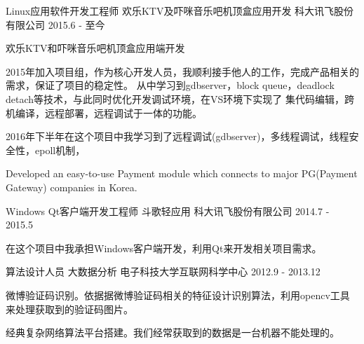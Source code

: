 

\begin{cventries}

  \cventry
    {Linux应用软件开发工程师} %
    {欢乐KTV及吓咪音乐吧机顶盒应用开发} %
    {科大讯飞股份有限公司} %
    {2015.6 - 至今} %
    {
      \begin{cvitems} %
        \item {欢乐KTV和吓咪音乐吧机顶盒应用端开发}
        \item {2015年加入项目组，作为核心开发人员，我顺利接手他人的工作，完成产品相关的需求，保证了项目的稳定性。
        从中学习到gdbserver，block queue，deadlock detach等技术，与此同时优化开发调试环境，在VS环境下实现了
        集代码编辑，跨机编译，远程部署，远程调试于一体的功能。}
        \item {2016年下半年在这个项目中我学习到了远程调试(gdbserver)，多线程调试，线程安全性，epoll机制，}
        \item {Developed an easy-to-use Payment module which connects to major PG(Payment Gateway) companies in Korea.}
      \end{cvitems}
    }

  \cventry
    {Windows Qt客户端开发工程师} %
    {斗歌轻应用} %
    {科大讯飞股份有限公司} %
    {2014.7 - 2015.5} %
    {
      \begin{cvitems} %
        \item {在这个项目中我承担Windows客户端开发，利用Qt来开发相关项目需求。}
      \end{cvitems}
    }

  \cventry
    {算法设计人员} %
    {大数据分析} %
    {电子科技大学互联网科学中心} %
    {2012.9 - 2013.12} %
    {
      \begin{cvitems} %
        \item {微博验证码识别。依据据微博验证码相关的特征设计识别算法，利用opencv工具来处理获取到的验证码图片。}
        \item {经典复杂网络算法平台搭建。我们经常获取到的数据是一台机器不能处理的。}
      \end{cvitems}
    }


\end{cventries}
